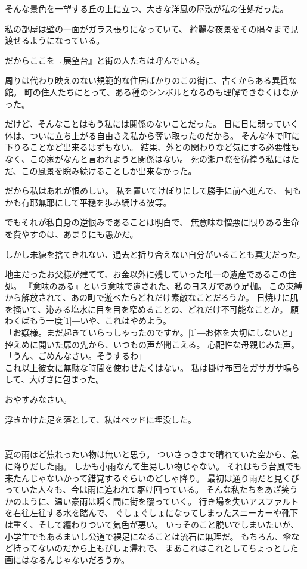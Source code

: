 \documentclass[../HiganMain]{subfiles}
\begin{document}
そんな景色を一望する丘の上に立つ、大きな洋風の屋敷が私の住処だった。

私の部屋は壁の一面がガラス張りになっていて、
綺麗な夜景をその隅々まで見渡せるようになっている。

だからここを『展望台』と街の人たちは呼んでいる。

周りは代わり映えのない規範的な住居ばかりのこの街に、古くからある異質な館。
町の住人たちにとって、ある種のシンボルとなるのも理解できなくはなかった。

だけど、そんなことはもう私には関係のないことだった。
日に日に弱っていく体は、ついに立ち上がる自由さえ私から奪い取ったのだから。
そんな体で町に下りることなど出来るはずもない。
結果、外との関わりなど気にする必要性もなく、この家がなんと言われようと関係はない。
死の瀬戸際を彷徨う私にはただ、この風景を睨み続けることしか出来なかった。

だから私はあれが恨めしい。
私を置いてけぼりにして勝手に前へ進んで、
何もかも有耶無耶にして平穏を歩み続ける彼等。

でもそれが私自身の逆恨みであることは明白で、
無意味な憎悪に限りある生命を費やすのは、あまりにも愚かだ。

しかし未練を捨てきれない、過去と折り合えない自分がいることも真実だった。

地主だったお父様が建てて、お金以外に残していった唯一の遺産であるこの住処。
『意味のある』という意味で遺された、私のヨスガであり足枷。
この束縛から解放されて、あの町で遊べたらどれだけ素敵なことだろうか。
日焼けに肌を掻いて、沁みる塩水に目を目を窄めることの、どれだけ不可能なことか。
願わくばもう一度\scalebox{3}[1]{―}いや、これはやめよう。\\

「お嬢様。まだ起きていらっしゃったのですか。\scalebox{3}[1]{―}お体を大切にしないと」\\
控えめに開いた扉の先から、いつもの声が聞こえる。
心配性な母親じみた声。\\
「うん、ごめんなさい。そうするわ」\\
これ以上彼女に無駄な時間を使わせたくはない。
私は掛け布団をガサガサ鳴らして、大げさに包まった。

おやすみなさい。

浮きかけた足を落として、私はベッドに埋没した。

\section{}
夏の雨ほど焦れったい物は無いと思う。
ついさっきまで晴れていた空から、急に降りだした雨。
しかも小雨なんて生易しい物じゃない。
それはもう台風でも来たんじゃないかって錯覚するぐらいのどしゃ降り。
最初は通り雨だと見くびっていた人々も、今は雨に追われて駆け回っている。
そんな私たちをあざ笑うかのように、温い豪雨は瞬く間に街を覆っていく。
行き場を失いアスファルトを右往左往する水を踏んで、
ぐしょぐしょになってしまったスニーカーや靴下は重く、そして纏わりついて気色が悪い。
いっそのこと脱いでしまいたいが、小学生でもあるまいし公道で裸足になることは流石に無理だ。
もちろん、傘など持ってないのだから上もびしょ濡れで、
まあこれはこれとしてちょっとした画にはなるんじゃないだろうか。
\end{document}
